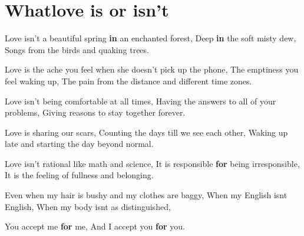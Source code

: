 \documentclass[
]{book}
\newenvironment{Shaded}{\begin{snugshade}}{\end{snugshade}}
\newcommand{\ControlFlowTok}[1]{\textcolor[rgb]{0.13,0.29,0.53}{\textbf{#1}}}
\newcommand{\NormalTok}[1]{#1}
\newcommand{\StringTok}[1]{\textcolor[rgb]{0.31,0.60,0.02}{#1}}
\begin{document}
\hypertarget{whatlove-is-or-isnt}{%
\chapter{Whatlove is or isn't}\label{whatlove-is-or-isnt}}

\begin{Shaded}
\begin{Highlighting}[]

\NormalTok{Love isn’t a beautiful spring }\ControlFlowTok{in}\NormalTok{ an enchanted forest,}
\NormalTok{Deep }\ControlFlowTok{in}\NormalTok{ the soft misty dew,}
\NormalTok{Songs from the birds and quaking trees.}

\NormalTok{Love is the ache you feel when she doesn’t pick up the phone,}
\NormalTok{The emptiness you feel waking up,}
\NormalTok{The pain from the distance and different time zones.}

\NormalTok{Love isn’t being comfortable at all times,}
\NormalTok{Having the answers to all of your problems,}
\NormalTok{Giving reasons to stay together forever.}

\NormalTok{Love is sharing our scars,}
\NormalTok{Counting the days till we see each other,}
\NormalTok{Waking up late and starting the day beyond normal.}

\NormalTok{Love isn’t rational like math and science,}
\NormalTok{It is responsible }\ControlFlowTok{for}\NormalTok{ being irresponsible, }
\NormalTok{It is the feeling of fullness and belonging.}

\NormalTok{Even when my hair is bushy and my clothes are baggy,}
\NormalTok{When my English isn}\StringTok{\textquotesingle{}t English,}
\StringTok{When my body isn\textquotesingle{}}\NormalTok{t as distinguished,}

\NormalTok{You accept me }\ControlFlowTok{for}\NormalTok{ me,}
\NormalTok{And I accept you }\ControlFlowTok{for}\NormalTok{ you.}
\end{Highlighting}
\end{Shaded}
\end{document}
